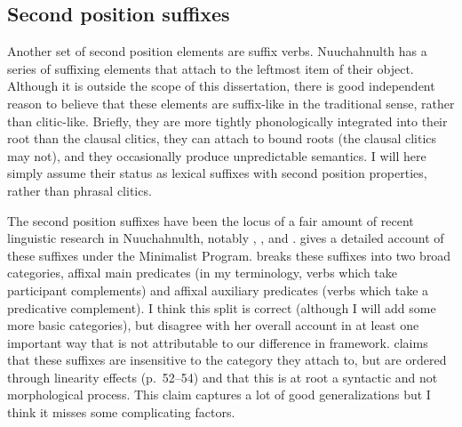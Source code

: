 \subsection{Second position suffixes} \label{ch:clause:2pv}

Another set of second position elements are suffix verbs. Nuuchahnulth has a series of suffixing elements that attach to the leftmost item of their object. Although it is outside the scope of this dissertation, there is good independent reason to believe that these elements are suffix-like in the traditional sense, rather than clitic-like. Briefly, they are more tightly phonologically integrated into their root than the clausal clitics, they can attach to bound roots (the clausal clitics may not), and they occasionally produce unpredictable semantics. I will here simply assume their status as lexical suffixes with second position properties, rather than phrasal clitics.

The second position suffixes have been the locus of a fair amount of recent linguistic research in Nuuchahnulth, notably \cite{waldie2004}, \cite{wojdak2005}, and \cite{woo2007b}. \cite{wojdak2005} gives a detailed account of these suffixes under the Minimalist Program. \citeauthor{wojdak2005} breaks these suffixes into two broad categories, affixal main predicates (in my terminology, verbs which take participant complements) and affixal auxiliary predicates (verbs which take a predicative complement). I think this split is correct (although I will add some more basic categories), but disagree with her overall account in at least one important way that is not attributable to our difference in framework. \citeauthor{wojdak2005} claims that these suffixes are insensitive to the category they attach to, but are ordered through linearity effects (p.\ 52--54) and that this is at root a syntactic and not morphological process. This claim captures a lot of good generalizations but I think it misses some complicating factors.

